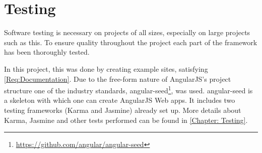 \section{Testing}
\label{Section:Overall_Testing}

Software testing is necessary on projects of all sizes, especially on large projects such as this. To ensure quality throughout the project each part of the framework has been thoroughly tested.

In this project, this was done by creating example sites, satisfying \cref{Req:Documentation}. Due to the free-form nature of AngularJS's project structure one of the industry standards, angular-seed\footnote{\url{https://github.com/angular/angular-seed}}, was used. angular-seed is a skeleton with which one can create AngularJS Web apps. It includes two testing frameworks (Karma and Jasmine) already set up. More details about Karma, Jasmine and other tests performed can be found in \autoref{Chapter: Testing}.


